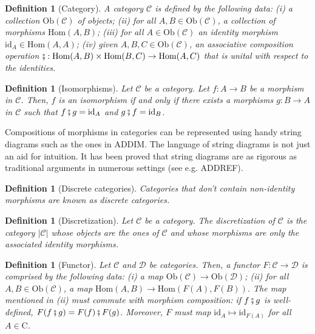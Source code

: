 \documentclass[11pt,a4paper,openright,twoside]{report}
\theoremstyle{plain}
\newtheorem{definition}[proposition]{Definition}
\theoremstyle{definition}
\begin{document}
\begin{definition}[Category]
  A category $\mathcal{C}$ is defined by the following data: (i) a collection $\mathrm{Ob}(\mathcal{C})$ of objects; (ii) for all $A, B \in \mathrm{Ob}(\mathcal{C})$, a collection of morphisms $\mathrm{Hom}(A,B)$; (iii) for all $A \in \mathrm{Ob}(\mathcal{C})$ an identity morphism $\mathrm{id}_A \in \mathrm{Hom}(A,A)$; (iv) given $A, B, C \in \mathrm{Ob}(\mathcal{C})$, an associative composition operation $\fatsemi:\mathrm{Hom}(A,B) \times \mathrm{Hom}(B,C) \to \mathrm{Hom}(A,C)$  that is unital with respect to the identities.
\end{definition}

\begin{definition}[Isomorphisms]
  Let $\mathcal{C}$ be a category. Let $f:A \to B$ be a morphism in $\mathcal{C}$. Then, $f$ is an isomorphism if and only if there exists a morphisms $g: B \to A$ in $\mathcal{C}$ such that $f \fatsemi g = \mathrm{id}_A$ and $g \fatsemi f = \mathrm{id}_B$.
\end{definition}

Compositions of morphisms in categories can be represented using handy string diagrams such as the ones in ADDIM. The language of string diagrams is not just an aid for intuition. It has been proved that string diagrams are as rigorous as traditional arguments in numerous settings (see e.g. ADDREF).

\begin{definition}[Discrete categories]
  Categories that don't contain non-identity morphisms are known as discrete categories.
\end{definition}

\begin{definition}[Discretization]
  Let $\mathcal{C}$ be a category. The discretization of $\mathcal{C}$ is the category $|\mathcal{C}|$ whose objects are the ones of $\mathcal{C}$ and whose morphisms are only the associated identity morphisms.
\end{definition}

\begin{definition}[Functor]
  Let $\mathcal{C}$ and $\mathcal{D}$ be categories. Then, a functor $F: \mathcal{C} \to \mathcal{D}$ is comprised by the following data: (i) a map $\mathrm{Ob}(\mathcal{C}) \to \mathrm{Ob}(\mathcal{D})$; (ii) for all $A, B \in \mathrm{Ob}(\mathcal{C})$, a map $\mathrm{Hom}(A,B) \to \mathrm{Hom}(F(A),F(B))$. The map mentioned in (ii) must commute with morphism composition: if $f \fatsemi g$ is well-defined, $F(f \fatsemi g) = F(f) \fatsemi F(g)$. Moreover, $F$ must map $\mathrm{id}_A \mapsto \mathrm{id}_{F(A)}$ for all $A \in \mathrm{C}$.
\end{definition}
\end{document}
